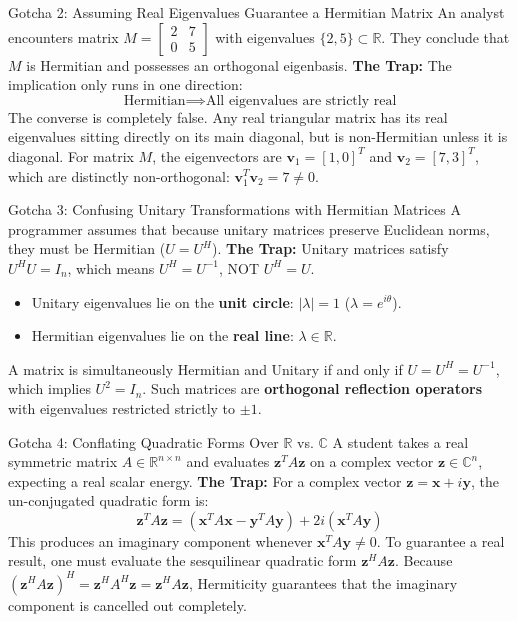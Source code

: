 \begin{trapbox}{Gotcha 2: Assuming Real Eigenvalues Guarantee a Hermitian Matrix}
An analyst encounters matrix $M = \begin{bmatrix} 2 & 7 \\ 0 & 5 \end{bmatrix}$ with eigenvalues $\{2, 5\} \subset \mathbb{R}$. They conclude that $M$ is Hermitian and possesses an orthogonal eigenbasis.
\textbf{The Trap:} The implication only runs in one direction:
\begin{equation*}
\text{Hermitian} \implies \text{All eigenvalues are strictly real}
\end{equation*}
The converse is completely false. Any real triangular matrix has its real eigenvalues sitting directly on its main diagonal, but is non-Hermitian unless it is diagonal. For matrix $M$, the eigenvectors are $\mathbf{v}_1 = [1, 0]^T$ and $\mathbf{v}_2 = [7, 3]^T$, which are distinctly non-orthogonal: $\mathbf{v}_1^T \mathbf{v}_2 = 7 \ne 0$.
\end{trapbox}

\begin{trapbox}{Gotcha 3: Confusing Unitary Transformations with Hermitian Matrices}
A programmer assumes that because unitary matrices preserve Euclidean norms, they must be Hermitian ($U = U^H$).
\textbf{The Trap:} Unitary matrices satisfy $U^H U = I_n$, which means $U^H = U^{-1}$, NOT $U^H = U$.
\begin{itemize}
    \item Unitary eigenvalues lie on the \textbf{unit circle}: $|\lambda| = 1$ ($\lambda = e^{i\theta}$).
    \item Hermitian eigenvalues lie on the \textbf{real line}: $\lambda \in \mathbb{R}$.
\end{itemize}
A matrix is simultaneously Hermitian and Unitary if and only if $U = U^H = U^{-1}$, which implies $U^2 = I_n$. Such matrices are \textbf{orthogonal reflection operators} with eigenvalues restricted strictly to $\pm 1$.
\end{trapbox}

\begin{trapbox}{Gotcha 4: Conflating Quadratic Forms Over $\mathbb{R}$ vs. $\mathbb{C}$}
A student takes a real symmetric matrix $A \in \mathbb{R}^{n \times n}$ and evaluates $\mathbf{z}^T A \mathbf{z}$ on a complex vector $\mathbf{z} \in \mathbb{C}^n$, expecting a real scalar energy.
\textbf{The Trap:} For a complex vector $\mathbf{z} = \mathbf{x} + i\mathbf{y}$, the un-conjugated quadratic form is:
\begin{equation*}
\mathbf{z}^T A \mathbf{z} = (\mathbf{x}^T A \mathbf{x} - \mathbf{y}^T A \mathbf{y}) + 2i(\mathbf{x}^T A \mathbf{y})
\end{equation*}
This produces an imaginary component whenever $\mathbf{x}^T A \mathbf{y} \ne 0$. To guarantee a real result, one must evaluate the sesquilinear quadratic form $\mathbf{z}^H A \mathbf{z}$. Because $(\mathbf{z}^H A \mathbf{z})^H = \mathbf{z}^H A^H \mathbf{z} = \mathbf{z}^H A \mathbf{z}$, Hermiticity guarantees that the imaginary component is cancelled out completely.
\end{trapbox}

